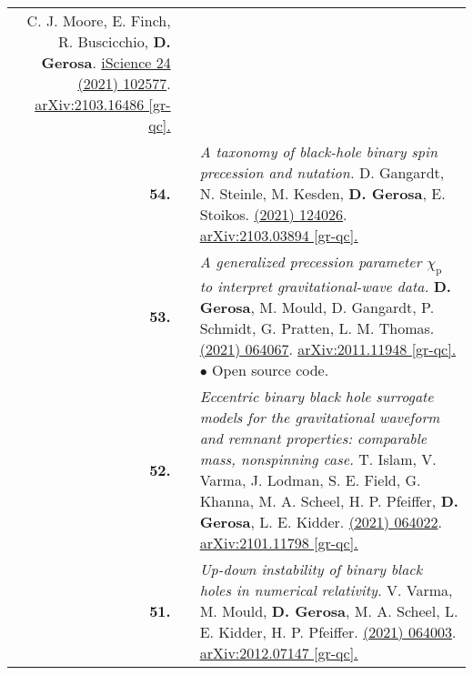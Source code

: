 {\begin{longtable}{rp{0.3cm}p{15.8cm}}
C. J. Moore, E. Finch, R. Buscicchio, \textbf{D. Gerosa}.
\newline{}
\href{https://www.sciencedirect.com/science/article/pii/S2589004221005459}{iScience 24 (2021) 102577}. \href{https://arxiv.org/abs/2103.16486}{arXiv:2103.16486   [gr-qc].}
\vspace{0.09cm}\\
%
\textbf{54.} & & \textit{A taxonomy of black-hole binary spin precession and nutation.}
\newline{}
D. Gangardt, N. Steinle, M. Kesden, \textbf{D. Gerosa}, E. Stoikos.
\newline{}
\href{https://journals.aps.org/prd/abstract/10.1103/PhysRevD.103.124026}{\prd 103 (2021) 124026}. \href{https://arxiv.org/abs/2103.03894}{arXiv:2103.03894 [gr-qc].}
\vspace{0.09cm}\\
%
\textbf{53.} & & \textit{A generalized precession parameter $\chi_\mathrm{p}$ to interpret gravitational-wave data.}
\newline{}
\textbf{D. Gerosa}, M. Mould, D. Gangardt, P. Schmidt, G. Pratten, L. M. Thomas.
\newline{}
\href{https://journals.aps.org/prd/abstract/10.1103/PhysRevD.103.064067}{\prd 103 (2021) 064067}. \href{https://arxiv.org/abs/2011.11948}{arXiv:2011.11948 [gr-qc].}
\newline{}
\textcolor{color1}{$\bullet$} Open source code.
\vspace{0.09cm}\\
%
\textbf{52.} & & \textit{Eccentric binary black hole surrogate models for the gravitational waveform and remnant properties: comparable mass, nonspinning case.}
\newline{}
T. Islam, V. Varma, J. Lodman, S. E. Field, G. Khanna, M. A. Scheel, H. P. Pfeiffer,  \textbf{D. Gerosa}, L. E. Kidder.
\newline{}
\href{https://journals.aps.org/prd/abstract/10.1103/PhysRevD.103.064022}{\prd 103 (2021) 064022}. \href{https://arxiv.org/abs/2101.11798}{arXiv:2101.11798 [gr-qc].}
\vspace{0.09cm}\\
%
\textbf{51.} & & \textit{Up-down instability of binary black holes in numerical relativity.}
\newline{}
V. Varma, M. Mould, \textbf{D. Gerosa}, M. A. Scheel, L. E. Kidder, H. P. Pfeiffer.
\newline{}
\href{https://journals.aps.org/prd/abstract/10.1103/PhysRevD.103.064003}{\prd 103 (2021) 064003}. \href{https://arxiv.org/abs/2012.07147}{arXiv:2012.07147 [gr-qc].}

\end{longtable}}
